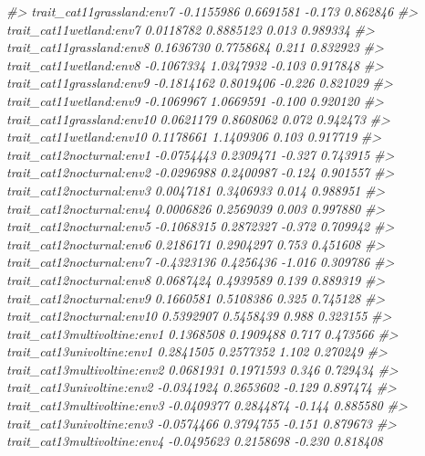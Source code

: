 \documentclass[
]{article}
\newenvironment{Shaded}{\begin{snugshade}}{\end{snugshade}}
\newcommand{\CommentTok}[1]{\textcolor[rgb]{0.56,0.35,0.01}{\textit{#1}}}
\begin{document}
\begin{Shaded}
\begin{Highlighting}[]
\CommentTok{\#\textgreater{} trait\_cat11grassland:env7     {-}0.1155986  0.6691581  {-}0.173 0.862846    }
\CommentTok{\#\textgreater{} trait\_cat11wetland:env7        0.0118782  0.8885123   0.013 0.989334    }
\CommentTok{\#\textgreater{} trait\_cat11grassland:env8      0.1636730  0.7758684   0.211 0.832923    }
\CommentTok{\#\textgreater{} trait\_cat11wetland:env8       {-}0.1067334  1.0347932  {-}0.103 0.917848    }
\CommentTok{\#\textgreater{} trait\_cat11grassland:env9     {-}0.1814162  0.8019406  {-}0.226 0.821029    }
\CommentTok{\#\textgreater{} trait\_cat11wetland:env9       {-}0.1069967  1.0669591  {-}0.100 0.920120    }
\CommentTok{\#\textgreater{} trait\_cat11grassland:env10     0.0621179  0.8608062   0.072 0.942473    }
\CommentTok{\#\textgreater{} trait\_cat11wetland:env10       0.1178661  1.1409306   0.103 0.917719    }
\CommentTok{\#\textgreater{} trait\_cat12nocturnal:env1     {-}0.0754443  0.2309471  {-}0.327 0.743915    }
\CommentTok{\#\textgreater{} trait\_cat12nocturnal:env2     {-}0.0296988  0.2400987  {-}0.124 0.901557    }
\CommentTok{\#\textgreater{} trait\_cat12nocturnal:env3      0.0047181  0.3406933   0.014 0.988951    }
\CommentTok{\#\textgreater{} trait\_cat12nocturnal:env4      0.0006826  0.2569039   0.003 0.997880    }
\CommentTok{\#\textgreater{} trait\_cat12nocturnal:env5     {-}0.1068315  0.2872327  {-}0.372 0.709942    }
\CommentTok{\#\textgreater{} trait\_cat12nocturnal:env6      0.2186171  0.2904297   0.753 0.451608    }
\CommentTok{\#\textgreater{} trait\_cat12nocturnal:env7     {-}0.4323136  0.4256436  {-}1.016 0.309786    }
\CommentTok{\#\textgreater{} trait\_cat12nocturnal:env8      0.0687424  0.4939589   0.139 0.889319    }
\CommentTok{\#\textgreater{} trait\_cat12nocturnal:env9      0.1660581  0.5108386   0.325 0.745128    }
\CommentTok{\#\textgreater{} trait\_cat12nocturnal:env10     0.5392907  0.5458439   0.988 0.323155    }
\CommentTok{\#\textgreater{} trait\_cat13multivoltine:env1   0.1368508  0.1909488   0.717 0.473566    }
\CommentTok{\#\textgreater{} trait\_cat13univoltine:env1     0.2841505  0.2577352   1.102 0.270249    }
\CommentTok{\#\textgreater{} trait\_cat13multivoltine:env2   0.0681931  0.1971593   0.346 0.729434    }
\CommentTok{\#\textgreater{} trait\_cat13univoltine:env2    {-}0.0341924  0.2653602  {-}0.129 0.897474    }
\CommentTok{\#\textgreater{} trait\_cat13multivoltine:env3  {-}0.0409377  0.2844874  {-}0.144 0.885580    }
\CommentTok{\#\textgreater{} trait\_cat13univoltine:env3    {-}0.0574466  0.3794755  {-}0.151 0.879673    }
\CommentTok{\#\textgreater{} trait\_cat13multivoltine:env4  {-}0.0495623  0.2158698  {-}0.230 0.818408    }

\end{Highlighting}
\end{Shaded}
\end{document}
